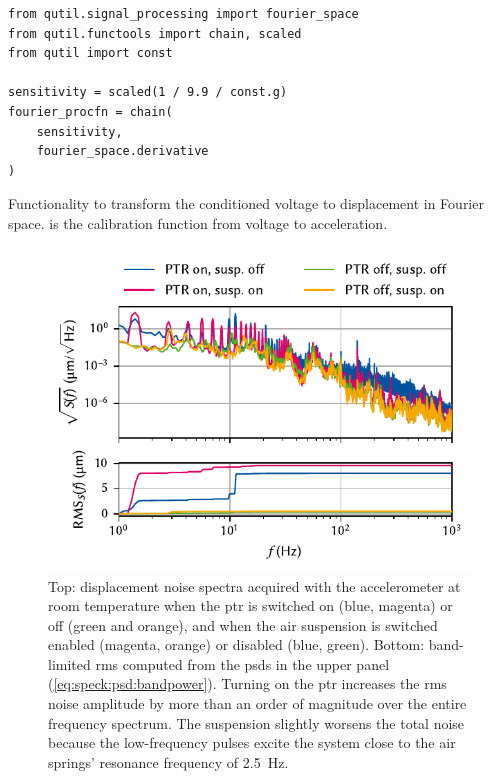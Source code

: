 \begin{marginlisting}
    \begin{verbatim}
from qutil.signal_processing import fourier_space
from qutil.functools import chain, scaled
from qutil import const

sensitivity = scaled(1 / 9.9 / const.g)
fourier_procfn = chain(
    sensitivity,
    fourier_space.derivative
)
    \end{verbatim}
    \caption{
        Functionality to transform the conditioned voltage to displacement in Fourier space.
         is the calibration function from voltage to acceleration.
    }
    \label{lst:setup:vibrations:accel}
\end{marginlisting}
\begin{figure}
    \centering
    \includegraphics{img/pdf/setup/spect_accel}
    \caption[]{
        Top: displacement noise spectra acquired with the accelerometer at room temperature when the \gls{ptr} is switched on (blue, magenta) or off (green and orange), and when the air suspension is switched enabled (magenta, orange) or disabled (blue, green).
        Bottom: band-limited \gls{rms} computed from the \glspl{psd} in the upper panel (\cf \cref{eq:speck:psd:bandpower}).
        Turning on the \gls{ptr} increases the \gls{rms} noise amplitude by more than an order of magnitude over the entire frequency spectrum.
        The suspension slightly worsens the total noise because the low-frequency pulses excite the system close to the air springs' resonance frequency of \qty{2.5}{\hertz}.
    }
    \label{fig:setup:vibrations:accel}
\end{figure}

